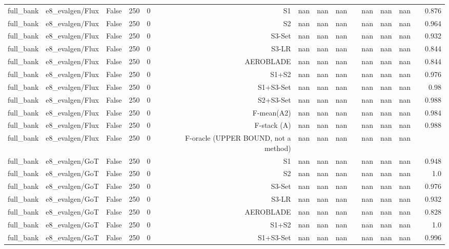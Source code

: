 \begin{table}[htbp]
\begin{tabular}{llrrrrrrrrrrrrr}
full\_bank & e8\_evalgen/Flux & False & 250 & 0 & S1 & nan & nan & nan &  & nan & nan & nan &  & 0.876 \\
full\_bank & e8\_evalgen/Flux & False & 250 & 0 & S2 & nan & nan & nan &  & nan & nan & nan &  & 0.964 \\
full\_bank & e8\_evalgen/Flux & False & 250 & 0 & S3-Set & nan & nan & nan &  & nan & nan & nan &  & 0.932 \\
full\_bank & e8\_evalgen/Flux & False & 250 & 0 & S3-LR & nan & nan & nan &  & nan & nan & nan &  & 0.844 \\
full\_bank & e8\_evalgen/Flux & False & 250 & 0 & AEROBLADE & nan & nan & nan &  & nan & nan & nan &  & 0.844 \\
full\_bank & e8\_evalgen/Flux & False & 250 & 0 & S1+S2 & nan & nan & nan &  & nan & nan & nan &  & 0.976 \\
full\_bank & e8\_evalgen/Flux & False & 250 & 0 & S1+S3-Set & nan & nan & nan &  & nan & nan & nan &  & 0.98 \\
full\_bank & e8\_evalgen/Flux & False & 250 & 0 & S2+S3-Set & nan & nan & nan &  & nan & nan & nan &  & 0.988 \\
full\_bank & e8\_evalgen/Flux & False & 250 & 0 & F-mean(A2) & nan & nan & nan &  & nan & nan & nan &  & 0.984 \\
full\_bank & e8\_evalgen/Flux & False & 250 & 0 & F-stack (A) & nan & nan & nan &  & nan & nan & nan &  & 0.988 \\
full\_bank & e8\_evalgen/Flux & False & 250 & 0 & F-oracle (UPPER BOUND, not a method) & nan & nan & nan &  & nan & nan & nan &  &  \\
full\_bank & e8\_evalgen/GoT & False & 250 & 0 & S1 & nan & nan & nan &  & nan & nan & nan &  & 0.948 \\
full\_bank & e8\_evalgen/GoT & False & 250 & 0 & S2 & nan & nan & nan &  & nan & nan & nan &  & 1.0 \\
full\_bank & e8\_evalgen/GoT & False & 250 & 0 & S3-Set & nan & nan & nan &  & nan & nan & nan &  & 0.976 \\
full\_bank & e8\_evalgen/GoT & False & 250 & 0 & S3-LR & nan & nan & nan &  & nan & nan & nan &  & 0.932 \\
full\_bank & e8\_evalgen/GoT & False & 250 & 0 & AEROBLADE & nan & nan & nan &  & nan & nan & nan &  & 0.828 \\
full\_bank & e8\_evalgen/GoT & False & 250 & 0 & S1+S2 & nan & nan & nan &  & nan & nan & nan &  & 1.0 \\
full\_bank & e8\_evalgen/GoT & False & 250 & 0 & S1+S3-Set & nan & nan & nan &  & nan & nan & nan &  & 0.996 \\

\end{tabular}
\end{table}

